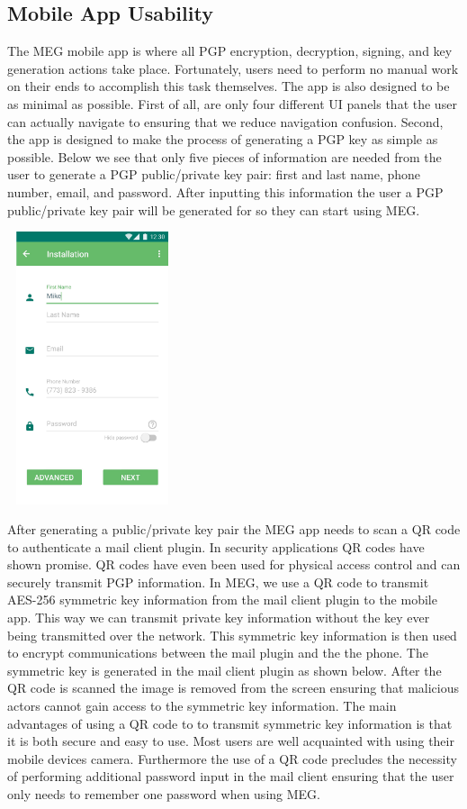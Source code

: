 \documentclass[10pt]{article}
\begin{document}
\begin{multicols}{2}
\subsection{Mobile App Usability}
\par The MEG mobile app is where all PGP encryption, decryption, signing, and key generation actions take place. Fortunately, users need to perform no manual work on their ends to accomplish this task themselves. The app is also designed to be as minimal as possible. First of all, are only four different UI panels that the user can actually navigate to ensuring that we reduce navigation confusion. Second, the app is designed to make the process of generating a PGP key as simple as possible. Below we see that only five pieces of information are needed from the user to generate a PGP public/private key pair: first and last name, phone number, email, and password. After inputting this information the user a PGP public/private key pair will be generated for so they can start using MEG.
\begin{center}
\includegraphics[height=8cm,width=5cm]{installation-page.jpg}
\label{fig:installation}
\end{center}
\par After generating a public/private key pair the MEG app needs to scan a QR code to authenticate a mail client plugin. In security applications QR codes have shown promise. QR codes have even been used for physical access control \cite{qrcode-authentication} and can securely transmit PGP information\cite{qrcode-key-distribution}. In MEG, we use a QR code to transmit AES-256 symmetric key information from the mail client plugin to the mobile app. This way we can transmit private key information without the key ever being transmitted over the network. This symmetric key information is then used to encrypt communications between the mail plugin and the the phone. The symmetric key is generated in the mail client plugin as shown below. After the QR code is scanned the image is removed from the screen ensuring that malicious actors cannot gain access to the symmetric key information. The main advantages of using a QR code to to transmit symmetric key information is that it is both secure and easy to use. Most users are well acquainted with using their mobile devices camera. Furthermore the use of a QR code precludes the necessity of performing additional password input in the mail client ensuring that the user only needs to remember one password when using MEG.

\end{multicols}
\end{document}
